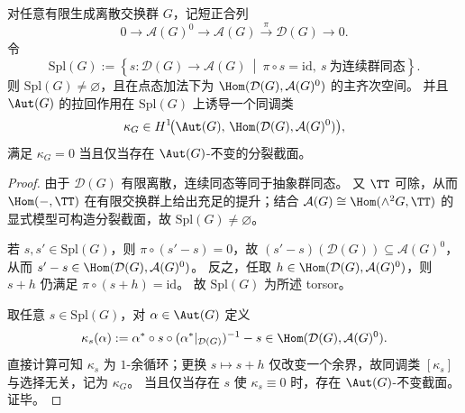 \begin{proposition}\label{prop:cdim-anomaly-splitting-torsor-obstruction}
对任意有限生成离散交换群 \(G\)，记短正合列
\[
0\longrightarrow \mathcal A(G)^0\longrightarrow \mathcal A(G)\overset{\pi}{\longrightarrow}\mathcal D(G)\longrightarrow 0.
\]
令
\[
\mathrm{Spl}(G):=\left\{s:\mathcal D(G)\to\mathcal A(G)\ \middle|\ \pi\circ s=\mathrm{id},\ s\ \text{为连续群同态}\right\}.
\]
则 \(\mathrm{Spl}(G)\neq\varnothing\)，且在点态加法下为 \(\Hom(\mathcal D(G),\mathcal A(G)^0)\) 的主齐次空间。
并且 \(\Aut(G)\) 的拉回作用在 \(\mathrm{Spl}(G)\) 上诱导一个同调类
\[
\kappa_G\in H^1\!\bigl(\Aut(G),\,\Hom(\mathcal D(G),\mathcal A(G)^0)\bigr),
\]
满足 \(\kappa_G=0\) 当且仅当存在 \(\Aut(G)\)-不变的分裂截面。
\end{proposition}
\begin{proof}
由于 \(\mathcal D(G)\) 有限离散，连续同态等同于抽象群同态。
又 \(\TT\) 可除，从而 \(\Hom(-,\TT)\) 在有限交换群上给出充足的提升；结合 \(\mathcal A(G)\cong\Hom(\wedge^2G,\TT)\) 的显式模型可构造分裂截面，故 \(\mathrm{Spl}(G)\neq\varnothing\)。

若 \(s,s'\in\mathrm{Spl}(G)\)，则 \(\pi\circ(s'-s)=0\)，故 \((s'-s)(\mathcal D(G))\subseteq \mathcal A(G)^0\)，从而 \(s'-s\in\Hom(\mathcal D(G),\mathcal A(G)^0)\)。
反之，任取 \(h\in\Hom(\mathcal D(G),\mathcal A(G)^0)\)，则 \(s+h\) 仍满足 \(\pi\circ(s+h)=\mathrm{id}\)。
故 \(\mathrm{Spl}(G)\) 为所述 torsor。

取任意 \(s\in\mathrm{Spl}(G)\)，对 \(\alpha\in\Aut(G)\) 定义
\[
\kappa_s(\alpha):=\alpha^\ast\circ s\circ(\alpha^\ast|_{\mathcal D(G)})^{-1}-s\in\Hom(\mathcal D(G),\mathcal A(G)^0).
\]
直接计算可知 \(\kappa_s\) 为 \(1\)-余循环；更换 \(s\mapsto s+h\) 仅改变一个余界，故同调类 \([\kappa_s]\) 与选择无关，记为 \(\kappa_G\)。
当且仅当存在 \(s\) 使 \(\kappa_s\equiv 0\) 时，存在 \(\Aut(G)\)-不变截面。证毕。
\end{proof}

